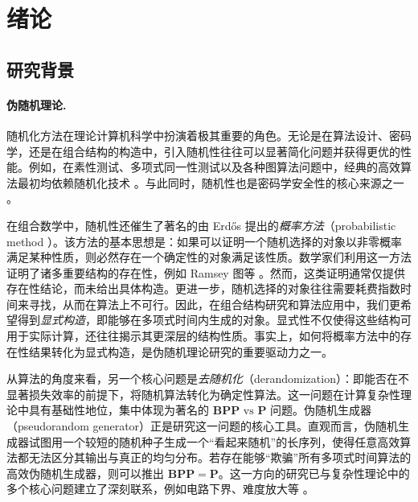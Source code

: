 \section{绪论}\label{sec:introduction}

\subsection{研究背景}

\paragraph{伪随机理论.}

随机化方法在理论计算机科学中扮演着极其重要的角色。无论是在算法设计、密码学，还是在组合结构的构造中，引入随机性往往可以显著简化问题并获得更优的性能。例如，在素性测试、多项式同一性测试以及各种图算法问题中，经典的高效算法最初均依赖随机化技术 \cite{Mitzenmacher_Upfal_Probability_and_Computing}。与此同时，随机性也是密码学安全性的核心来源之一 \cite{Goldreich_crypto_book_1,Goldreich_crypto_book_2,GOLDWASSER1984270}。

在组合数学中，随机性还催生了著名的由 Erd\H{o}s 提出的\emph{概率方法}（probabilistic method \cite{The_Probabilistic_Method}）。该方法的基本思想是：如果可以证明一个随机选择的对象以非零概率满足某种性质，则必然存在一个确定性的对象满足该性质。数学家们利用这一方法证明了诸多重要结构的存在性，例如 Ramsey 图等 \cite{Erdos_Ramsey_prob_method}。然而，这类证明通常仅提供存在性结论，而未给出具体构造。更进一步，随机选择的对象往往需要耗费指数时间来寻找，从而在算法上不可行。因此，在组合结构研究和算法应用中，我们更希望得到\emph{显式构造}，即能够在多项式时间内生成的对象。显式性不仅使得这些结构可用于实际计算，还往往揭示其更深层的结构性质。事实上，如何将概率方法中的存在性结果转化为显式构造，是伪随机理论研究的重要驱动力之一。

从算法的角度来看，另一个核心问题是\emph{去随机化}（derandomization）：即能否在不显著损失效率的前提下，将随机算法转化为确定性算法。这一问题在计算复杂性理论中具有基础性地位，集中体现为著名的 $\mathbf{BPP}\text{ vs }\mathbf{P}$ 问题。伪随机生成器（pseudorandom generator）正是研究这一问题的核心工具。直观而言，伪随机生成器试图用一个较短的随机种子生成一个“看起来随机”的长序列，使得任意高效算法都无法区分其输出与真正的均匀分布。若存在能够“欺骗”所有多项式时间算法的高效伪随机生成器，则可以推出 $\mathbf{BPP} = \mathbf{P}$。这一方向的研究已与复杂性理论中的多个核心问题建立了深刻联系，例如电路下界、难度放大等 \cite{Nisan_Wigderson_Hardness_vs_randomness,IW97_worst_case_to_PRG,Yao_PRG}。

